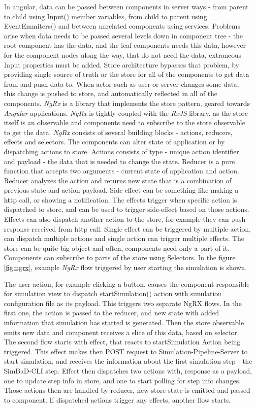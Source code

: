 In angular, data can be passed between components in server ways - from parent to child using Input() member variables, from child to parent using EventEmmiters() and between unrelated components using services. Problems arise when data needs to be passed several levels down in component tree - the root component has the data, and the leaf components needs this data, however for the component nodes along the way, that do not need the data, extraneous Input properties must be added. Store architecture bypasses that problem, by providing single source of truth or the store for all of the components to get data from and push data to. When actor such as user or server changes some data, this change is pushed to store, and automatically reflected in all of the components.
\textit{NgRx} is a library that implements the store pattern, geared towards \textit{Angular} applications. \textit{NgRx} is tightly coupled with the \textit{RxJS} library, as the store itself is an observable and components need to subscribe to the store observable to get the data.
\textit{NgRx} consists of several building blocks - actions, reducers, effects and selectors. The components can alter state of application or by dispatching actions to store. Actions consists of type - unique action identifier and payload - the data that is needed to change the state. Reducer is a pure function that accepts two arguments - current state of application and action. Reducer analyzes the action and returns new state that is a combination of previous state and action payload. Side effect can be something like making a http call, or showing a notification. The effects trigger when specific action is dispatched to store, and can be used to trigger side-effect based on those actions. Effects can also dispatch another action to the store, for example they can push response received from http call. Single effect can be triggered by multiple action, can dispatch multiple actions and single action can trigger multiple effects. The store can be quite big object and often, components need only a part of it. Components can subscribe to parts of the store using Selectors. In the figure \ref{fig:ngrx}, example \textit{NgRx} flow triggered by user starting the simulation is shown.

The user action, for example clicking a button, causes the component responsible for simulation view to dispatch startSimulation() action with simulation configuration file as its payload. This triggers two separate NgRX flows. In the first one, the action is passed to the reducer, and new state with added information that simulation has started is generated. Then the store observable emits new data and component receives a slice of this data, based on selector. The second flow starts with effect, that reacts to startSimulation Action being triggered. This effect makes then POST request to Simulation-Pipeline-Server to start simulation, and receives the information about the first simulation step - the SimBaD-CLI step. Effect then dispatches two actions with, response as a payload, one to update step info in store, and one to start polling for step info changes. Those actions then are handled by reducer, new store state is emitted and passed to component. If dispatched actions trigger any effects, another flow starts.
